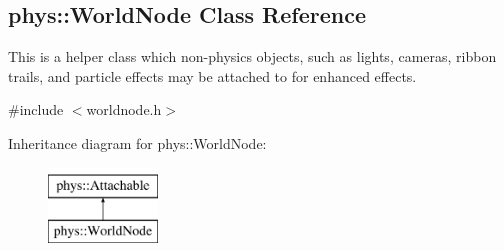 \hypertarget{classphys_1_1WorldNode}{
\subsection{phys::WorldNode Class Reference}
\label{d2/d3e/classphys_1_1WorldNode}
}


This is a helper class which non-\/physics objects, such as lights, cameras, ribbon trails, and particle effects may be attached to for enhanced effects.  




{\ttfamily \#include $<$worldnode.h$>$}

Inheritance diagram for phys::WorldNode:\begin{figure}[H]
\begin{center}
\leavevmode
\includegraphics[height=2.000000cm]{d2/d3e/classphys_1_1WorldNode}
\end{center}
\end{figure}
